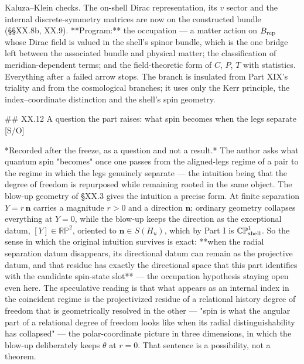 Kaluza–Klein checks. The on-shell Dirac representation, its $v$ sector and the internal discrete-symmetry matrices are now on the constructed bundle (§§XX.8b, XX.9). **Program:** the occupation — a matter action on $B_{\rm rep}$ whose Dirac field is valued in the shell's spinor bundle, which is the one bridge left between the associated bundle and physical matter; the classification of meridian-dependent terms; and the field-theoretic form of $C$, $P$, $T$ with statistics. Everything after a failed arrow stops. The branch is insulated from Part XIX's triality and from the cosmological branches; it uses only the Kerr principle, the index–coordinate distinction and the shell's spin geometry.

## XX.12 A question the part raises: what spin becomes when the legs separate [S/O]

*Recorded after the freeze, as a question and not a result.* The author asks what quantum spin "becomes" once one passes from the aligned-legs regime of a pair to the regime in which the legs genuinely separate — the intuition being that the degree of freedom is repurposed while remaining rooted in the same object. The blow-up geometry of §XX.3 gives the intuition a precise form. At finite separation $Y = r\,\mathbf n$ carries a magnitude $r>0$ and a direction $\mathbf n$; ordinary geometry collapses everything at $Y = 0$, while the blow-up keeps the direction as the exceptional datum, $[Y]\in\mathbb{RP}^2$, oriented to $\mathbf n\in S(H_u)$, which by Part I is $\mathbb{CP}^1_{\rm shell}$. So the sense in which the original intuition survives is exact: **when the radial separation datum disappears, its directional datum can remain as the projective datum, and that residue has exactly the directional space that this part identifies with the candidate spin-state slot** — the occupation hypothesis staying open even here. The speculative reading is that what appears as an internal index in the coincident regime is the projectivized residue of a relational history degree of freedom that is geometrically resolved in the other — "spin is what the angular part of a relational degree of freedom looks like when its radial distinguishability has collapsed" — the polar-coordinate picture in three dimensions, in which the blow-up deliberately keeps $\theta$ at $r = 0$. That sentence is a possibility, not a theorem.

